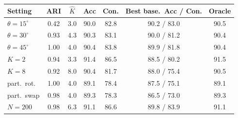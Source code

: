\begin{tabular}{lcccccc}
\toprule
Setting & ARI & $\hat K$ & Acc & Con. & Best base.\ Acc / Con. & Oracle \\
\midrule
$\theta{=}15^\circ$ & 0.42 & 3.0 & 90.0 & 82.8 & 90.2 / 83.0 & 90.5 \\
$\theta{=}30^\circ$ & 0.93 & 4.3 & 90.3 & 83.1 & 90.0 / 81.2 & 90.4 \\
$\theta{=}45^\circ$ & 1.00 & 4.0 & 90.4 & 83.8 & 89.9 / 81.8 & 90.4 \\
$K{=}2$ & 0.94 & 3.3 & 91.4 & 86.5 & 88.5 / 80.2 & 91.5 \\
$K{=}8$ & 0.92 & 8.0 & 90.4 & 81.7 & 88.0 / 75.4 & 90.5 \\
part.\ rot. & 1.00 & 4.0 & 89.1 & 78.4 & 87.5 / 75.1 & 89.1 \\
part.\ swap & 0.98 & 4.0 & 89.3 & 78.3 & 86.5 / 73.0 & 89.3 \\
$N{=}200$ & 0.98 & 6.3 & 91.1 & 86.6 & 89.8 / 83.9 & 91.1 \\
\bottomrule
\end{tabular}
